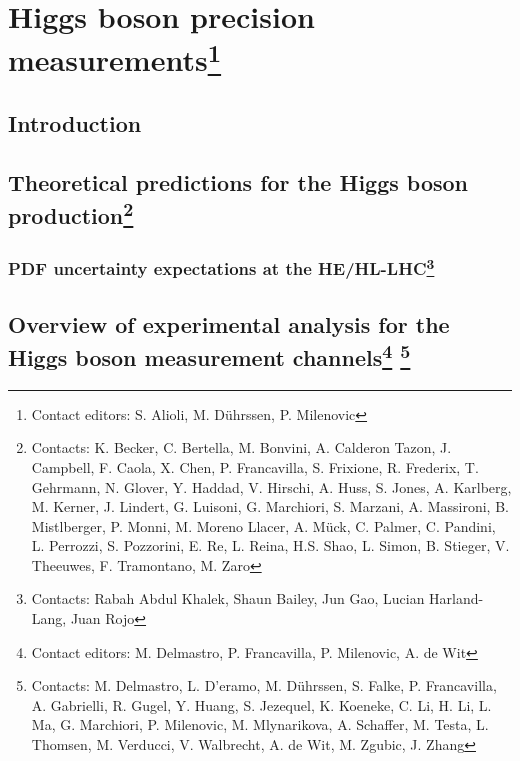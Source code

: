 \documentclass[../report.tex]{subfiles}
\providecommand{\main}{..}
\begin{document}
\section[Higgs boson precision measurements]{Higgs boson precision measurements\footnote{Contact editors: S. Alioli, M. D\"uhrssen, P. Milenovic}\label{sec2}}
\subsection{Introduction}
\label{sec2:introduction}


\subsection[Theoretical predictions for the Higgs boson production]{Theoretical predictions for the Higgs boson production\footnote{Contacts: K. Becker, C. Bertella, M. Bonvini, A. Calderon Tazon, J. Campbell, F. Caola, X. Chen,
P. Francavilla, S. Frixione, R. Frederix, T. Gehrmann, N. Glover, Y. Haddad, V. Hirschi, A. Huss, S. Jones, 
A. Karlberg, M. Kerner, J. Lindert, G. Luisoni, G. Marchiori, S. Marzani, A. Massironi, B. Mistlberger,
P. Monni, M. Moreno Llacer, A. M\"uck, C. Palmer, C. Pandini, L. Perrozzi, S. Pozzorini, E. Re, L. Reina,
H.S. Shao, L. Simon, B. Stieger, V. Theeuwes, F. Tramontano, M. Zaro}
}
\label{sec2_HXSWG1}


\subsubsection[PDF uncertainty expectations at the HE/HL-LHC]{PDF uncertainty expectations at the HE/HL-LHC\footnote{Contacts: Rabah Abdul Khalek, Shaun Bailey, Jun Gao, Lucian Harland-Lang,  Juan Rojo}}
\label{sec2:PDFuncertainties}


\subsection[Overview of experimental analysis for the Higgs boson measurement channels]{Overview of experimental analysis for the Higgs boson measurement channels\footnote{Contact editors: M. Delmastro, P. Francavilla, P. Milenovic, A. de Wit}
\footnote{Contacts: M. Delmastro, L. D'eramo, M. D\"uhrssen, S. Falke, P. Francavilla, A. Gabrielli, R. Gugel, Y. Huang, S. Jezequel, K. Koeneke, C. Li, H. Li, L. Ma, G. Marchiori, P. Milenovic, M. Mlynarikova, A. Schaffer, M. Testa, L. Thomsen, M. Verducci, V. Walbrecht, A. de Wit, M. Zgubic, J. Zhang}}
\label{sec2:expan}
\label{sec2:channels}

\end{document}
